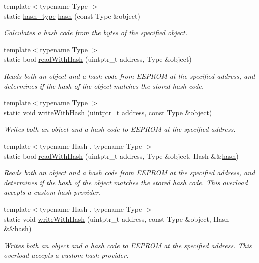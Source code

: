 \begin{DoxyCompactItemize}
{\footnotesize template$<$typename Type $>$ }\\static \mbox{\hyperlink{classArduboy2EEPROM_a6221853153af216c0d6087f1e1455cd7}{hash\+\_\+type}} \mbox{\hyperlink{classArduboy2EEPROM_a1eb431b4eb962bbd5fe1b18d7ac2af21}{hash}} (const Type \&object)
\begin{DoxyCompactList}\small\item\em Calculates a hash code from the bytes of the specified object. \end{DoxyCompactList}\item 
{\footnotesize template$<$typename Type $>$ }\\static bool \mbox{\hyperlink{classArduboy2EEPROM_abbfe69135a48dc52120d209bfba38b7a}{read\+With\+Hash}} (uintptr\+\_\+t address, Type \&object)
\begin{DoxyCompactList}\small\item\em Reads both an object and a hash code from E\+E\+P\+R\+OM at the specified address, and determines if the hash of the object matches the stored hash code. \end{DoxyCompactList}\item 
{\footnotesize template$<$typename Type $>$ }\\static void \mbox{\hyperlink{classArduboy2EEPROM_a55111051528b8d43a03bd7dd842b0679}{write\+With\+Hash}} (uintptr\+\_\+t address, const Type \&object)
\begin{DoxyCompactList}\small\item\em Writes both an object and a hash code to E\+E\+P\+R\+OM at the specified address. \end{DoxyCompactList}\item 
{\footnotesize template$<$typename Hash , typename Type $>$ }\\static bool \mbox{\hyperlink{classArduboy2EEPROM_a6b0ef10b0c2f082b2c55a6e002802512}{read\+With\+Hash}} (uintptr\+\_\+t address, Type \&object, Hash \&\&\mbox{\hyperlink{classArduboy2EEPROM_a0d81ac363020a75a0b56af7eb014f5b4}{hash}})
\begin{DoxyCompactList}\small\item\em Reads both an object and a hash code from E\+E\+P\+R\+OM at the specified address, and determines if the hash of the object matches the stored hash code. This overload accepts a custom hash provider. \end{DoxyCompactList}\item 
{\footnotesize template$<$typename Hash , typename Type $>$ }\\static void \mbox{\hyperlink{classArduboy2EEPROM_a40f0abec863d2772e8da19d3cf37e980}{write\+With\+Hash}} (uintptr\+\_\+t address, const Type \&object, Hash \&\&\mbox{\hyperlink{classArduboy2EEPROM_a0d81ac363020a75a0b56af7eb014f5b4}{hash}})
\begin{DoxyCompactList}\small\item\em Writes both an object and a hash code to E\+E\+P\+R\+OM at the specified address. This overload accepts a custom hash provider. \end{DoxyCompactList}\end{DoxyCompactItemize}


